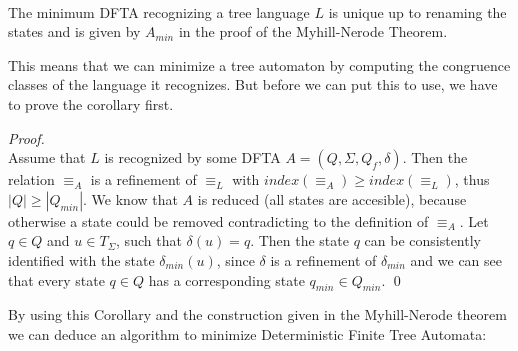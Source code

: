 \documentclass{llncs}
\begin{document}
\begin{corollary} \cite{tata-nfta}\\
	The minimum DFTA recognizing a tree language \(L\) is unique up to renaming the states and is given by \(A_{min}\) in the proof of the Myhill-Nerode Theorem.
\end{corollary}

This means that we can minimize a tree automaton by computing the congruence classes of the language it recognizes. But before we can put this to use, we have to prove the corollary first.

\begin{proof} {~} \cite{tata-nfta}\\
	Assume that \(L\) is recognized by some DFTA \(A = (Q, \Sigma, Q_f, \delta)\). Then the relation \(\equiv_A\) is a refinement of \(\equiv_L\) with \(index(\equiv_A) \geq index(\equiv_L)\), thus \(|Q| \geq |Q_{min}|\). We know that \(A\) is reduced (all states are accesible), because otherwise a state could be removed contradicting to the definition of \(\equiv_A\). Let \(q \in Q\) and \(u \in T_\Sigma\), such that \(\delta(u) = q\). Then the state \(q\) can be consistently identified with the state \(\delta_{min}(u)\), since \(\delta\) is a refinement of \(\delta_{min}\) and we can see that every state \(q \in Q\) has a corresponding state \(q_{min} \in Q_{min}\).
	\qed
\end{proof}

By using this Corollary and the construction given in the Myhill-Nerode theorem we can deduce an algorithm to minimize Deterministic Finite Tree Automata:
\end{document}
